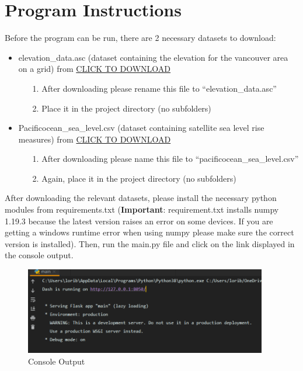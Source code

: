 \documentclass[fontsize=11pt]{article}
\begin{document}
    \section*{Program Instructions}
    Before the program can be run, there are 2 necessary datasets to download:
    \begin{itemize}
        \item elevation\_data.asc (dataset containing the elevation for the vancouver area on a grid) from
        \href{https://drive.google.com/file/d/1pCJPV3rH0k5obd4s5SHKsn5q8E2FqlKg/view?usp=sharing}{CLICK TO DOWNLOAD}
        \begin{itemize}
            \item[1.] After downloading please rename this file to “elevation\_data.asc”
            \item[2.] Place it in the project directory (no subfolders)
        \end{itemize}
        \item Pacificocean\_sea\_level.csv (dataset containing satellite sea level rise measures) from
        \href{https://www.star.nesdis.noaa.gov/socd/lsa/SeaLevelRise/slr/slr_sla_np_keep_txj1j2.csv}{CLICK TO DOWNLOAD}
        \begin{itemize}
            \item[1.] After downloading please name this file to “pacificocean\_sea\_level.csv”
            \item[2.] Again, place it in the project directory (no subfolders)
        \end{itemize}
    \end{itemize}

    After downloading the relevant datasets, please install the necessary python modules from requirements.txt (\textbf{Important}: requirement.txt installs numpy 1.19.3 because the latest version raises an error on some devices. If you are getting a windows runtime error when using numpy please make sure the correct version is installed).
    Then, run the main.py file and click on the link displayed in the console output. \\
    \begin{figure}[h]
        \centering
        \includegraphics[width=300pt]{console.png}
        \caption{Console Output}
    \end{figure}
\end{document}
